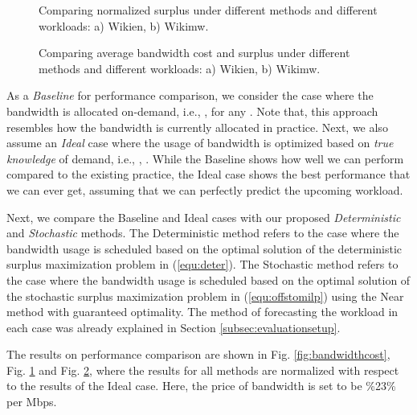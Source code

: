 \documentclass[10pt,journal,compsoc]{IEEEtran}
\begin{document}
\begin{figure}[!t]
\centering
{}
\caption{Comparing normalized surplus under different methods and different workloads: a) Wikien, b) Wikimw.\vspace{-0.2cm}}\label{fig:performance}
\end{figure}

\begin{figure}[!t]
\centering
{}
\caption{Comparing average bandwidth cost and surplus under different methods and different workloads: a) Wikien, b) Wikimw.\vspace{-0.2cm}}\label{fig:average}
\end{figure}
As a \emph{Baseline} for performance comparison, we consider the case where the bandwidth is allocated on-demand, i.e., , for any . Note that, this approach resembles how the bandwidth is currently allocated in practice. Next, we also assume an \emph{Ideal} case where the usage of bandwidth is optimized based on \emph{true knowledge} of demand, i.e., , . While the Baseline shows how well we can perform compared to the existing practice, the Ideal case shows the best performance that we can ever get, assuming that we can perfectly predict the upcoming workload.




Next, we compare the Baseline and Ideal cases with our proposed \emph{Deterministic} and \emph{Stochastic} methods. The Deterministic method refers to the case where the bandwidth usage is scheduled based on the optimal solution of the deterministic surplus maximization problem in (\ref{equ:deter}). The Stochastic method refers to the case where the bandwidth usage is scheduled based on the optimal solution of the stochastic surplus maximization problem in (\ref{equ:offstomilp}) using the Near method with  guaranteed optimality. The method of forecasting the workload in each case was already explained in Section \ref{subsec:evaluationsetup}.

The results on performance comparison are shown in Fig. \ref{fig:bandwidthcost}, Fig. \ref{fig:performance} and Fig. \ref{fig:average}, where the results for all methods are normalized with respect to the results of the Ideal case. Here, the price of bandwidth is set to be  \%23\% per Mbps. 
\end{document}
